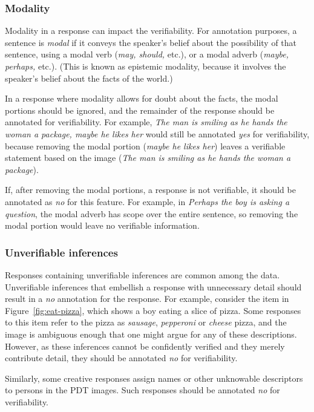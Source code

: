 \documentclass[12pt,notitlepage]{article}
\begin{document}
\subsubsection{Modality} Modality in a response can impact the verifiability. For annotation purposes, a sentence is \textit{modal} if it conveys the speaker's belief about the possibility of that sentence, using a modal verb (\textit{may, should,} etc.), or a modal adverb (\textit{maybe, perhaps,} etc.). (This is known as epistemic modality, because it involves the speaker's belief about the facts of the world.)

In a response where modality allows for doubt about the facts, the modal portions should be ignored, and the remainder of the response should be annotated for verifiability. For example, \textit{The man is smiling as he hands the woman a package, maybe he likes her} would still be annotated \textit{yes} for verifiability, because removing the modal portion (\textit{maybe he likes her}) leaves a verifiable statement based on the image (\textit{The man is smiling as he hands the woman a package}).

If, after removing the modal portions, a response is not verifiable, it should be annotated as \textit{no} for this feature. For example, in \textit{Perhaps the boy is asking a question}, the modal adverb has scope over the entire sentence, so removing the modal portion would leave no verifiable information.

\subsubsection{Unverifiable inferences} Responses containing unverifiable inferences are common among the data. Unverifiable inferences that embellish a response with unnecessary detail should result in a \textit{no} annotation for the response. For example, consider the item in Figure~\ref{fig:eat-pizza}, which shows a boy eating a slice of pizza. Some responses to this item refer to the pizza as \textit{sausage}, \textit{pepperoni} or \textit{cheese} pizza, and the image is ambiguous enough that one might argue for any of these descriptions. However, as these inferences cannot be confidently verified and they merely contribute detail, they should be annotated \textit{no} for verifiability.

Similarly, some creative responses assign names or other unknowable descriptors to persons in the PDT images. Such responses should be annotated \textit{no} for verifiability.
\end{document}
